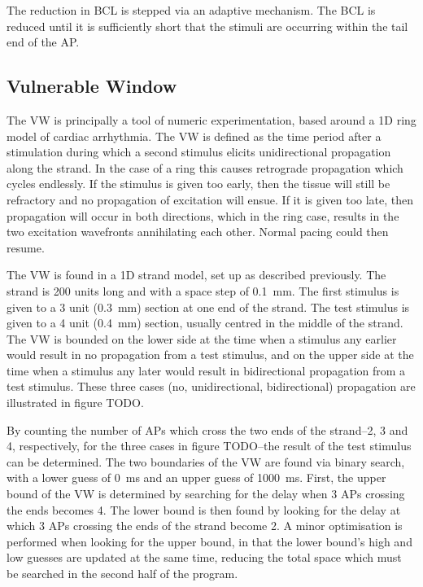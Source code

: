 The reduction in BCL is stepped via an adaptive mechanism.  The BCL is reduced
until it is sufficiently short that the stimuli are occurring within the tail end
of the AP.

\subsection{Vulnerable Window}

The VW is principally a tool of numeric experimentation, based around a 1D ring
model of cardiac arrhythmia.  The VW is defined as the time period after a
stimulation during which a second stimulus elicits unidirectional propagation
along the strand.  In the case of a ring this causes retrograde propagation
which cycles endlessly.  If the stimulus is given too early, then the tissue
will still be refractory and no propagation of excitation will ensue.  If it is
given too late, then propagation will occur in both directions, which in the
ring case, results in the two excitation wavefronts annihilating each other.
Normal pacing could then resume.

The VW is found in a 1D strand model, set up as described previously.  The
strand is 200 units long and with a space step of 0.1~mm.  The first stimulus is
given to a 3 unit (0.3~mm) section at one end of the strand.  The test stimulus
is given to a 4 unit (0.4~mm) section, usually centred in the middle of the
strand. The VW is bounded on the lower side at the time when a stimulus any
earlier would result in no propagation from a test stimulus, and on the upper
side at the time when a stimulus any later would result in bidirectional
propagation from a test stimulus.  These three cases (no, unidirectional,
bidirectional) propagation are illustrated in figure TODO.

By counting the number of APs which cross the two ends of the strand--2, 3 and
4, respectively, for the three cases in figure TODO--the result of the test
stimulus can be determined.  The two boundaries of the VW are found via binary
search, with a lower guess of 0~ms and an upper guess of 1000~ms.  First, the
upper bound of the VW is determined by searching for the delay when 3 APs
crossing the ends becomes 4.  The lower bound is then found by looking for the
delay at which 3 APs crossing the ends of the strand become 2.  A minor
optimisation is performed when looking for the upper bound, in that the lower
bound's high and low guesses are updated at the same time, reducing the total
space which must be searched in the second half of the program.

